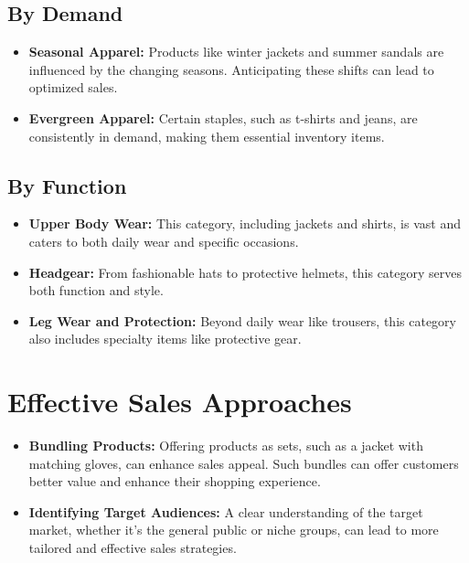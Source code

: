 \documentclass{article}
\begin{document}
\subsection{By Demand}
\begin{itemize}
    \item \textbf{Seasonal Apparel:} Products like winter jackets and summer sandals are influenced by the changing seasons. Anticipating these shifts can lead to optimized sales.
    \item \textbf{Evergreen Apparel:} Certain staples, such as t-shirts and jeans, are consistently in demand, making them essential inventory items.
\end{itemize}
\subsection{By Function}
\begin{itemize}
    \item \textbf{Upper Body Wear:} This category, including jackets and shirts, is vast and caters to both daily wear and specific occasions.
    \item \textbf{Headgear:} From fashionable hats to protective helmets, this category serves both function and style.
    \item \textbf{Leg Wear and Protection:} Beyond daily wear like trousers, this category also includes specialty items like protective gear.
\end{itemize}

\section{Effective Sales Approaches}
\begin{itemize}
    \item \textbf{Bundling Products:} Offering products as sets, such as a jacket with matching gloves, can enhance sales appeal. Such bundles can offer customers better value and enhance their shopping experience.
    \item \textbf{Identifying Target Audiences:} A clear understanding of the target market, whether it's the general public or niche groups, can lead to more tailored and effective sales strategies.
\end{itemize}
\end{document}
